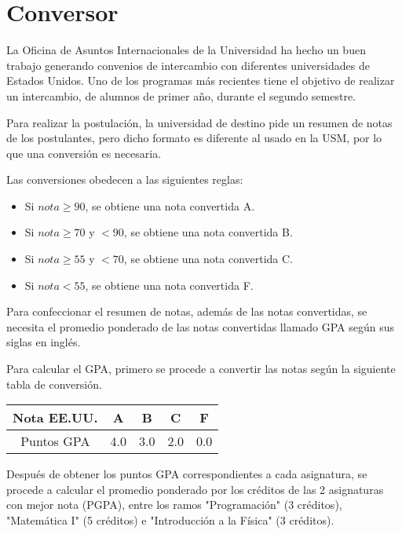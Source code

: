 \section*{Conversor}

  La Oficina de Asuntos Internacionales de la Universidad ha hecho un buen trabajo
  generando convenios de intercambio con diferentes universidades de Estados Unidos.
  Uno de los programas más recientes tiene el objetivo de realizar un intercambio,
  de alumnos de primer año, durante el segundo semestre.
  
  Para realizar la postulación,
  la universidad de destino pide un resumen de notas de los postulantes,
  pero dicho formato es diferente al usado en la USM,
  por lo que una conversión es necesaria.
  
  Las conversiones obedecen a las siguientes reglas:
  \begin{itemize}
  \item Si \(nota \ge 90\), se obtiene una nota convertida A.
  \item Si \(nota \ge 70\) y \(< 90 \), se obtiene una nota convertida B.
  \item Si \(nota \ge 55\) y \(< 70 \), se obtiene una nota convertida C.
  \item Si \(nota < 55\), se obtiene una nota convertida F.
  \end{itemize}
  
  Para confeccionar el resumen de notas,
  además de las notas convertidas,
  se necesita el promedio ponderado de las notas convertidas
  llamado GPA según sus siglas en inglés.
  
  Para calcular el GPA,
  primero se procede a convertir las notas
  según la siguiente tabla de conversión.
  
  \begin{table}[H]
    \begin{tabular}{c|c|c|c|c}
      \toprule
      Nota EE.UU. & A & B & C & F \\
      \midrule
      Puntos GPA  & 4.0 & 3.0 & 2.0 & 0.0  \\
      \bottomrule
    \end{tabular}
  \end{table}
  
  Después de obtener los puntos GPA correspondientes a cada asignatura,
  se procede a calcular el promedio ponderado por los créditos de las 2 asignaturas
  con mejor nota (PGPA),
  entre los ramos "Programación" (3 créditos),
  "Matemática I" (5 créditos) e "Introducción a la Física" (3 créditos).
  

